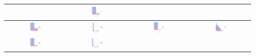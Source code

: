 \begin{table}[!htb]
\begin{center}
\begin{tabular}{ |c|c|c|c| }
			& \includegraphics[width=0.21\textwidth]{NOTEBOOK/IMAGENES_BIRCH_DESCRIPTIVAS/8} 
			\\  \hline 
			\includegraphics[width=0.21\textwidth]{NOTEBOOK/IMAGENES_BIRCH_DESCRIPTIVAS/9} 
			& \includegraphics[width=0.21\textwidth]{NOTEBOOK/IMAGENES_BIRCH_DESCRIPTIVAS/10} 
			& \includegraphics[width=0.21\textwidth]{NOTEBOOK/IMAGENES_BIRCH_DESCRIPTIVAS/11} 
			& \includegraphics[width=0.21\textwidth]{NOTEBOOK/IMAGENES_BIRCH_DESCRIPTIVAS/12} 
			\\  \hline 
			\includegraphics[width=0.21\textwidth]{NOTEBOOK/IMAGENES_BIRCH_DESCRIPTIVAS/13} 
			& \includegraphics[width=0.21\textwidth]{NOTEBOOK/IMAGENES_BIRCH_DESCRIPTIVAS/14} 

\end{tabular}
\end{center}
\end{table}

